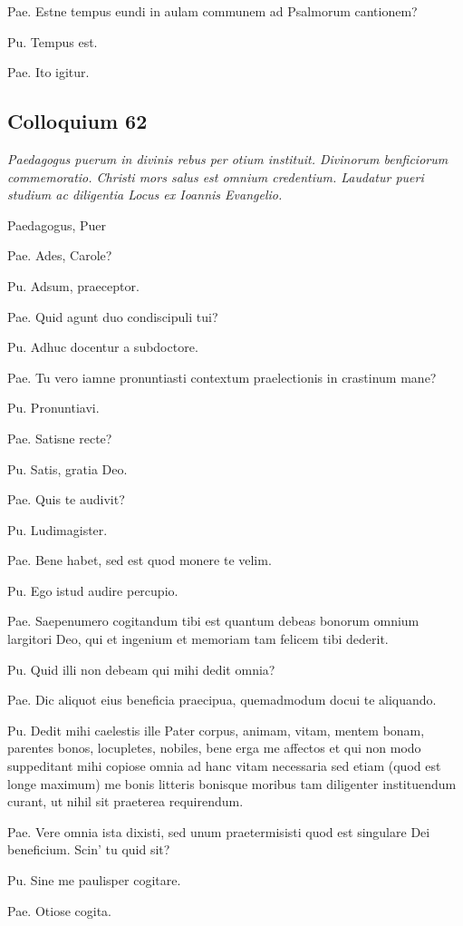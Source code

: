 \documentclass{article}
\begin{document}
Pae. Estne tempus eundi in aulam communem ad Psalmorum cantionem?

Pu. Tempus est. 

Pae. Ito igitur.

\subsection{Colloquium 62}
\emph{Paedagogus puerum in divinis rebus per otium instituit. Divinorum benficiorum commemoratio. Christi mors salus est omnium credentium. Laudatur pueri studium ac diligentia Locus ex Ioannis Evangelio.}

Paedagogus, Puer

Pae. Ades, Carole?

Pu. Adsum, praeceptor. 

Pae. Quid agunt duo condiscipuli tui?

Pu. Adhuc docentur a subdoctore.

Pae. Tu vero iamne pronuntiasti contextum praelectionis in crastinum mane?

Pu. Pronuntiavi. 

Pae. Satisne recte?

Pu. Satis, gratia Deo. 

Pae. Quis te audivit?

Pu. Ludimagister. 

Pae. Bene habet, sed est quod monere te velim. 

Pu. Ego istud audire percupio. 

Pae. Saepenumero cogitandum tibi est quantum debeas bonorum omnium largitori Deo, qui et ingenium et memoriam tam felicem tibi dederit. 

Pu. Quid illi non debeam qui mihi dedit omnia?

Pae. Dic aliquot eius beneficia praecipua, quemadmodum docui te aliquando. 

Pu. Dedit mihi caelestis ille Pater corpus, animam, vitam, mentem bonam, parentes bonos, locupletes, nobiles, bene erga me affectos et qui non modo suppeditant mihi copiose omnia ad hanc vitam necessaria sed etiam (quod est longe maximum) me bonis litteris bonisque moribus tam diligenter instituendum curant, ut nihil sit praeterea requirendum. 

Pae. Vere omnia ista dixisti, sed unum praetermisisti quod est singulare Dei beneficium. Scin' tu quid sit?

Pu. Sine me paulisper cogitare. 

Pae. Otiose cogita. 
\end{document}
